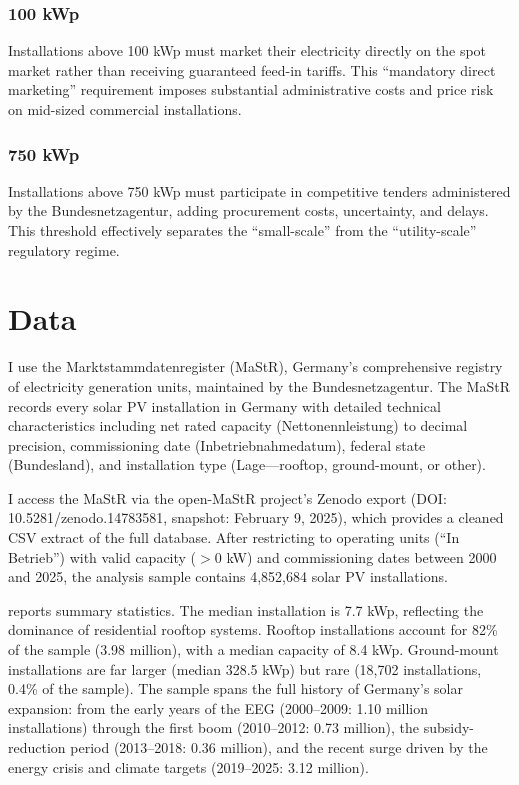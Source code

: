 \documentclass[12pt]{article}
\begin{document}
\subsubsection*{100 kWp} Installations above 100 kWp must market their electricity directly on the spot market rather than receiving guaranteed feed-in tariffs. This ``mandatory direct marketing'' requirement imposes substantial administrative costs and price risk on mid-sized commercial installations.

\subsubsection*{750 kWp} Installations above 750 kWp must participate in competitive tenders administered by the Bundesnetzagentur, adding procurement costs, uncertainty, and delays. This threshold effectively separates the ``small-scale'' from the ``utility-scale'' regulatory regime.


\section{Data}
\label{sec:data}

I use the Marktstammdatenregister (MaStR), Germany's comprehensive registry of electricity generation units, maintained by the Bundesnetzagentur. The MaStR records every solar PV installation in Germany with detailed technical characteristics including net rated capacity (Nettonennleistung) to decimal precision, commissioning date (Inbetriebnahmedatum), federal state (Bundesland), and installation type (Lage---rooftop, ground-mount, or other).

I access the MaStR via the open-MaStR project's Zenodo export (DOI: 10.5281/zenodo.14783581, snapshot: February 9, 2025), which provides a cleaned CSV extract of the full database. After restricting to operating units (``In Betrieb'') with valid capacity ($>0$ kW) and commissioning dates between 2000 and 2025, the analysis sample contains 4,852,684 solar PV installations.

 reports summary statistics. The median installation is 7.7 kWp, reflecting the dominance of residential rooftop systems. Rooftop installations account for 82\% of the sample (3.98 million), with a median capacity of 8.4 kWp. Ground-mount installations are far larger (median 328.5 kWp) but rare (18,702 installations, 0.4\% of the sample). The sample spans the full history of Germany's solar expansion: from the early years of the EEG (2000--2009: 1.10 million installations) through the first boom (2010--2012: 0.73 million), the subsidy-reduction period (2013--2018: 0.36 million), and the recent surge driven by the energy crisis and climate targets (2019--2025: 3.12 million).
\end{document}
